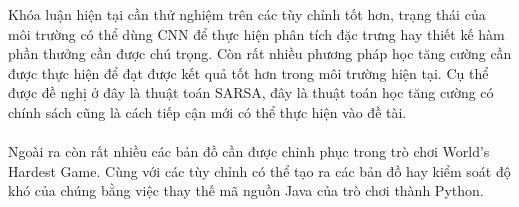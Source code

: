 Khóa luận hiện tại cần thử nghiệm trên các tùy chỉnh tốt hơn, trạng thái của môi trường có thể dùng CNN để thực hiện phân tích đặc trưng hay thiết kế hàm phần thưởng cần được chú trọng. Còn rất nhiều phương pháp học tăng cường cần được thực hiện để đạt được kết quả tốt hơn trong môi trường hiện tại. Cụ thể được đề nghị ở đây là thuật toán SARSA, đây là thuật toán học tăng cường có chính sách cũng là cách tiếp cận mới có thể thực hiện vào đề tài. \\
\\
Ngoài ra còn rất nhiều các bản đồ cần được chinh phục trong trò chơi World's Hardest Game. Cùng với các tùy chỉnh có thể tạo ra các bản đồ hay kiểm soát độ khó của chúng bằng việc thay thế mã nguồn Java của trò chơi thành Python.
